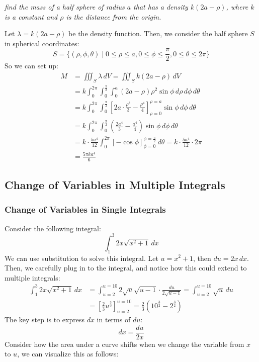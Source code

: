 \documentclass[11pt]{report}
\begin{document}
\begin{example}
    \textit{find the mass of a half sphere of radius $a$ that has a density $ k(2a - \rho)$, where $k$ is a constant and $\rho$ is the distance from the origin.}

    Let $\lambda = k(2a - \rho)$ be the density function. Then, we consider the half sphere $S$ in spherical coordinates:
    $$       
    S = \{(\rho, \phi, \theta) \mid 0 \le \rho \le a, 0 \le \phi \le \frac{\pi}{2}, 0 \le \theta \le 2\pi\}
    $$
    So we can set up:
    \begin{align*}
        M &= \iiint_S \lambda \, dV = \iiint_S k(2a - \rho) \, dV \\
        &= k \int_0^{2\pi} \int_0^{\frac{\pi}{2}} \int_0^a (2a - \rho) \rho^2 \sin \phi \, d\rho \, d\phi \, d\theta \\
        &= k \int_0^{2\pi} \int_0^{\frac{\pi}{2}} \left[ 2a \cdot \frac{\rho^3}{3} - \frac{\rho^4}{4} \right]_{\rho=0}^{\rho=a} \sin \phi \, d\phi \, d\theta \\
        &= k \int_0^{2\pi} \int_0^{\frac{\pi}{2}} \left( \frac{2a^4}{3} - \frac{a^4}{4} \right) \sin \phi \, d\phi \, d\theta \\
        &= k \cdot \frac{5a^4}{12} \int_0^{2\pi} \left[ -\cos \phi \right]_{\phi=0}^{\phi=\frac{\pi}{2}} \, d\theta = k \cdot \frac{5a^4}{12} \cdot 2\pi \\ 
        &= \frac{5\pi k a^4}{6}
    \end{align*}

\end{example}
\subsection{Change of Variables in Multiple Integrals} \label{sec:change_of_variables}
\begin{shaded}
    \subsubsection{Change of Variables in Single Integrals}
    Consider the following integral:
    $$
        \int_1^3 2x\sqrt{x^2 +1} \, dx
    $$
    We can use substitution to solve this integral. Let $u = x^2 + 1$, then $du = 2x \, dx$. Then, we carefully plug in to the integral, and notice how this could extend to multiple integrals:
    \begin{align*}
        \int_1^3 2x\sqrt{x^2 +1} \, dx &= \int_{u=2}^{u=10} 2 \sqrt{u} \sqrt{u-1} \cdot \frac{du}{2\sqrt{u-1}} = \int_{u=2}^{u=10} \sqrt{u} \, du \\
        &= \left[ \frac{2}{3} u^{\frac{3}{2}} \right]_{u=2}^{u=10} = \frac{2}{3} (10^{\frac{3}{2}} - 2^{\frac{3}{2}})
    \end{align*}
    The key step is to express $dx$ in terms of $du$:
    $$        
    dx = \frac{du}{2x}
    $$
    Consider how the area under a curve shifts when we change the variable from $x$ to $u$, we can visualize this as follows:
    \end{shaded}
    \newpage
\end{document}

